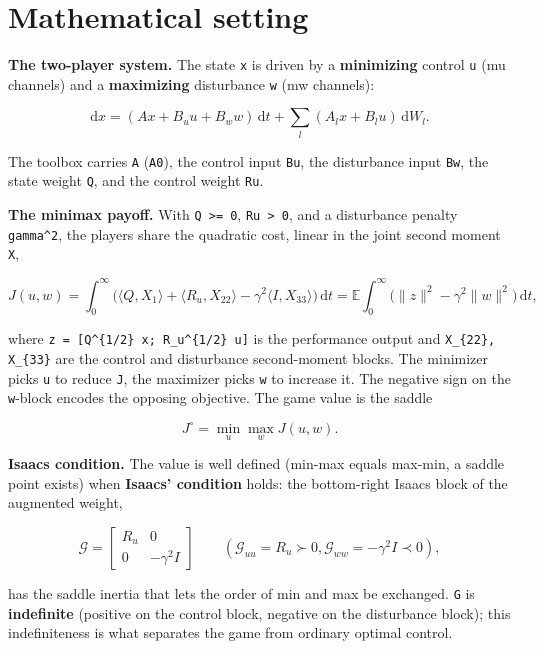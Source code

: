 \documentclass[11pt,oneside]{report}
\newcommand{\code}[1]{\texttt{#1}}
\begin{document}
\hypertarget{mathematical-setting}{%
\section{Mathematical setting}\label{mathematical-setting}}

\textbf{The two-player system.} The state \code{x} is driven by a \textbf{minimizing} control
\code{u} (mu channels) and a \textbf{maximizing} disturbance \code{w} (mw channels):

\[
\mathrm{d}x = (A x + B_u u + B_w w)\,\mathrm{d}t
   + \sum_l (A_l x + B_l u)\,\mathrm{d}W_l .
\]

The toolbox carries \code{A} (\code{A0}), the control input \code{Bu}, the disturbance input
\code{Bw}, the state weight \code{Q}, and the control weight \code{Ru}.

\textbf{The minimax payoff.} With \code{Q \textgreater{}= 0}, \code{Ru \textgreater{} 0}, and a disturbance penalty
\code{gamma\^{}2}, the players share the quadratic cost, linear in the joint second
moment \code{X},

\[
J(u,w) = \int_0^\infty \Big(\langle Q, X_1\rangle + \langle R_u, X_{22}\rangle
    - \gamma^2 \langle I, X_{33}\rangle\Big)\,\mathrm{d}t
   = \mathbb{E}\int_0^\infty \big(\lVert z\rVert^2 - \gamma^2 \lVert w\rVert^2\big)\,\mathrm{d}t ,
\]

where \code{z = [Q\^{}\{1/2\} x;  R\_u\^{}\{1/2\} u]} is the performance output and
\code{X\_\{22\}, X\_\{33\}} are the control and disturbance second-moment blocks. The
minimizer picks \code{u} to reduce \code{J}, the maximizer picks \code{w} to increase it. The
negative sign on the \code{w}-block encodes the opposing objective. The game value is
the saddle

\[
J^{\circ} = \min_{u} \max_{w}  J(u,w) .
\]

\textbf{Isaacs condition.} The value is well defined (min-max equals max-min, a
saddle point exists) when \textbf{Isaacs' condition} holds: the bottom-right Isaacs
block of the augmented weight,

\[
\mathcal{G} = \begin{bmatrix} R_u & 0 \\ 0 & -\gamma^2 I \end{bmatrix}
\qquad (\mathcal{G}_{uu} = R_u \succ 0,  \mathcal{G}_{ww} = -\gamma^2 I \prec 0),
\]

has the saddle inertia that lets the order of min and max be exchanged.
\code{G} is \textbf{indefinite} (positive on the control block, negative on the
disturbance block); this indefiniteness is what separates the game from ordinary
optimal control.
\end{document}

